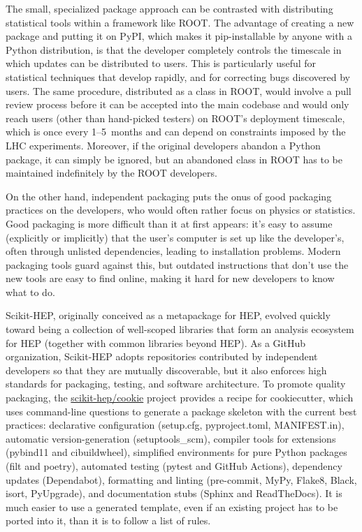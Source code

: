 \documentclass{article}
\begin{document}
The small, specialized package approach can be contrasted with distributing statistical tools within a framework like ROOT. The advantage of creating a new package and putting it on PyPI, which makes it pip-installable by anyone with a Python distribution, is that the developer completely controls the timescale in which updates can be distributed to users. This is particularly useful for statistical techniques that develop rapidly, and for correcting bugs discovered by users. The same procedure, distributed as a class in ROOT, would involve a pull review process before it can be accepted into the main codebase and would only reach users (other than hand-picked testers) on ROOT's deployment timescale, which is once every 1--5~months and can depend on constraints imposed by the LHC experiments. Moreover, if the original developers abandon a Python package, it can simply be ignored, but an abandoned class in ROOT has to be maintained indefinitely by the ROOT developers.

On the other hand, independent packaging puts the onus of good packaging practices on the developers, who would often rather focus on physics or statistics. Good packaging is more difficult than it at first appears: it's easy to assume (explicitly or implicitly) that the user's computer is set up like the developer's, often through unlisted dependencies, leading to installation problems. Modern packaging tools guard against this, but outdated instructions that don't use the new tools are easy to find online, making it hard for new developers to know what to do.

Scikit-HEP, originally conceived as a metapackage for HEP, evolved quickly toward being a collection of well-scoped libraries that form an analysis ecosystem for HEP (together with common libraries beyond HEP). As a GitHub organization, Scikit-HEP adopts repositories contributed by independent developers so that they are mutually discoverable, but it also enforces high standards for packaging, testing, and software architecture. To promote quality packaging, the \href{https://github.com/scikit-hep/cookie}{scikit-hep/cookie} project provides a recipe for cookiecutter, which uses command-line questions to generate a package skeleton with the current best practices: declarative configuration (setup.cfg, pyproject.toml, MANIFEST.in), automatic version-generation (setuptools\_scm), compiler tools for extensions (pybind11 and cibuildwheel), simplified environments for pure Python packages (filt and poetry), automated testing (pytest and GitHub Actions), dependency updates (Dependabot), formatting and linting (pre-commit, MyPy, Flake8, Black, isort, PyUpgrade), and documentation stubs (Sphinx and ReadTheDocs). It is much easier to use a generated template, even if an existing project has to be ported into it, than it is to follow a list of rules.
\end{document}
